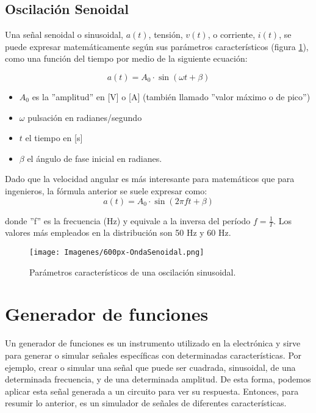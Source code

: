\documentclass{article}
\begin{document}
\subsection{Oscilación Senoidal}

Una señal senoidal o sinusoidal, $a(t)$, tensión, $v(t)$, o corriente, $i(t)$, se puede expresar matemáticamente según sus parámetros característicos (figura \ref{fig:ondaSenoidal}), como una función del tiempo por medio de la siguiente ecuación:\citep{CA}

\begin{equation}
    a(t)=A_0 \cdot \sin(\omega t + \beta)
\end{equation}
\begin{itemize}
    \item $A_0$ es la ''amplitud'' en [V] o [A] (también llamado ''valor máximo o de pico'')
    
    \item $\omega$  pulsación en radianes/segundo
    
    \item $t$ el tiempo en [s]
    
    \item $\beta$ el ángulo de fase inicial en radianes.
\end{itemize}


Dado que la velocidad angular es más interesante para matemáticos que para ingenieros, la fórmula anterior se suele expresar como:\citep{CA}\\

\begin{equation}
    a(t)=A_0 \cdot \sin(2 \pi f t + \beta)
\end{equation}


donde ''f'' es la frecuencia (Hz) y equivale a la inversa del período $f=\frac{1}{T}$. Los valores más empleados en la distribución son 50 Hz y 60 Hz.\citep{CA}


\begin{figure}[h!]
    \centering
    \texttt{[image: Imagenes/600px-OndaSenoidal.png]}
    \caption{Parámetros característicos de una oscilación sinusoidal.}
    \label{fig:ondaSenoidal}
\end{figure}

\section{Generador de funciones}

Un generador de funciones es un instrumento utilizado en la electrónica y sirve para generar o simular señales específicas con determinadas características. Por ejemplo, crear o simular una señal que puede ser cuadrada, sinusoidal, de una determinada frecuencia, y de una determinada amplitud. De esta forma, podemos aplicar esta señal generada a un circuito para ver su respuesta. Entonces, para resumir lo anterior, es un simulador de señales de diferentes características.\citep{GenFunc}
\end{document}
